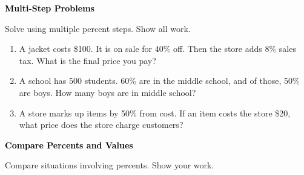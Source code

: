 \documentclass[12pt, letterpaper, fleqn]{article}
\begin{document}
\newpage

\begin{tcolorbox}[colback=customteal!20]
\large\textcolor{black}{\textbf{Multi-Step Problems}}
\end{tcolorbox}

\noindent
Solve using multiple percent steps. Show all work.

\vspace{3mm}

\begin{enumerate}[itemsep=2.2cm, leftmargin=0.6cm]

\item A jacket costs \$100. It is on sale for 40\% off. Then the store adds 8\% sales tax. What is the final price you pay?

\vspace{2.2cm}

\item A school has 500 students. 60\% are in the middle school, and of those, 50\% are boys. How many boys are in middle school?

\vspace{2.2cm}

\item A store marks up items by 50\% from cost. If an item costs the store \$20, what price does the store charge customers?

\vspace{2.2cm}

\end{enumerate}

\newpage

\begin{tcolorbox}[colback=customteal!20]
\large\textcolor{black}{\textbf{Compare Percents and Values}}
\end{tcolorbox}

\noindent
Compare situations involving percents. Show your work.

\vspace{3mm}
\end{document}
